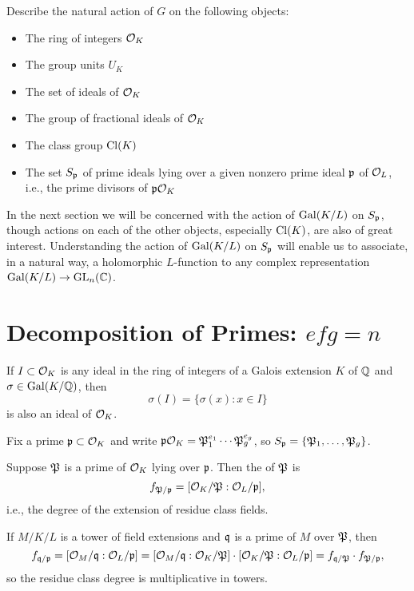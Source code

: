 \begin{exercise}
	Describe the natural action of $G$ on the following objects:
	\begin{itemize}
		\item The ring of integers $\O_K$
		\item The group units $U_K$
		\item The set of ideals of $\O_K$
		\item The group of fractional ideals of $\O_K$
		\item The class group $\Cl(K)$
		\item The set $S_\p$ of prime ideals lying over a given nonzero
	prime ideal $\p$ of $\O_L$, i.e., the prime divisors of $\p\O_K$
	\end{itemize}
\end{exercise}

In the next section we will be concerned with the action of
$\Gal(K/L)$ on $S_\p$, though actions on each of the other objects,
especially $\Cl(K)$, are also of great interest.  Understanding the
action of $\Gal(K/L)$ on $S_{\p}$ will enable us to associate, in a
natural way, a holomorphic $L$-function to any complex representation
$\Gal(K/L) \to \GL_n(\C)$.

\section{Decomposition of Primes: $efg=n$}

If $I\subset \O_K$ is any ideal in the ring of integers of
a Galois extension $K$ of $\Q$ and $\sigma\in\Gal(K/\Q)$, then
$$
	\sigma(I) = \{\sigma(x) : x \in I\}
$$
is also an ideal of $\O_K$.

Fix a prime $\p\subset \O_K$ and write $\p\O_K = \P_1^{e_1}\cdots
\P_g^{e_g}$, so $S_\p=\{\P_1,\ldots, \P_g\}$.
\begin{definition}
	Suppose $\P$ is a prime of $\O_K$ lying over $\p$.
	Then the  of $\P$ is
	$$
		f_{\P/\p} = [\O_K/\P : \O_L/\p],
	$$
	i.e., the degree of the extension of residue class fields.
\end{definition}
If $M/K/L$ is a tower of field extensions and
$\q$ is a prime of $M$ over $\P$, then
$$f_{\q/\p} = [\O_M/\q : \O_L/\p]
=[\O_M/\q : \O_K/\P]\cdot [\O_K/\P : \O_L/\p] =
f_{\q/\P}\cdot f_{\P/\p},$$
so the residue class degree is multiplicative in
towers.

